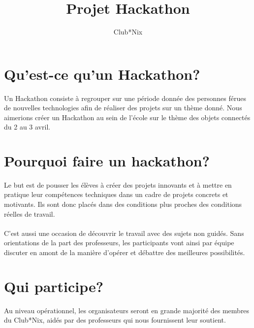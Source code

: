 \documentclass{article}
\title{Projet Hackathon}
\author{Club*Nix}
\begin{document}
\maketitle

\section{Qu'est-ce qu'un Hackathon?}

\paragraph{}
Un Hackathon consiste à regrouper sur une période donnée des personnes férues
de nouvelles technologies afin de réaliser des projets sur un thème donné. Nous
aimerions créer un Hackathon au sein de l'école sur le thème des objets
connectés du 2 au 3 avril.

\section{Pourquoi faire un hackathon?}

\paragraph{}
Le but est de pousser les élèves à créer des projets innovants et à mettre en
pratique leur compétences techniques dans un cadre de projets concrets et
motivants. Ils sont donc placés dans des conditions plus proches des conditions
réelles de travail.

\paragraph{}
C'est aussi une occasion de découvrir le travail avec des sujets non guidés.
Sans orientations de la part des professeurs, les participants vont ainsi par équipe 
discuter en amont de la manière d'opérer et débattre des meilleures
possibilités.

\section{Qui participe?}

\paragraph{}
Au niveau opérationnel, les organisateurs seront en grande majorité des
membres du Club*Nix, aidés par des professeurs qui nous fournissent leur
soutient.
\end{document}
